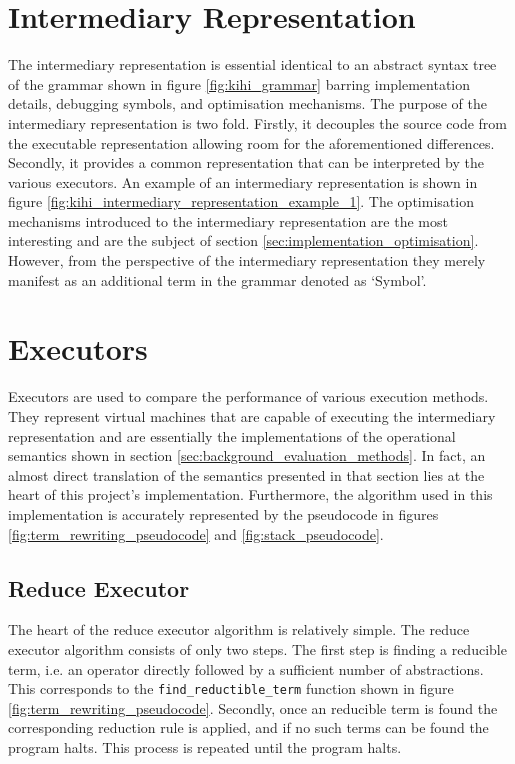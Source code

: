 \section{Intermediary Representation}\label{sec:implementation_intermediary_representation}
The intermediary representation is essential identical to an abstract syntax tree of the grammar shown in figure \ref{fig:kihi_grammar} barring implementation details, debugging symbols, and optimisation mechanisms. The purpose of the intermediary representation is two fold. Firstly, it decouples the source code from the executable representation allowing room for the aforementioned differences. Secondly, it provides a common representation that can be interpreted by the various executors. An example of an intermediary representation is shown in figure \ref{fig:kihi_intermediary_representation_example_1}. The optimisation mechanisms introduced to the intermediary representation are the most interesting and are the subject of section \ref{sec:implementation_optimisation}. However, from the perspective of the intermediary representation they merely manifest as an additional term in the grammar denoted as `Symbol'.




\section{Executors}\label{sec:implementation_executors}
Executors are used to compare the performance of various execution methods. They represent virtual machines that are capable of executing the intermediary representation and are essentially the implementations of the operational semantics shown in section \ref{sec:background_evaluation_methods}. In fact, an almost direct translation of the semantics presented in that section lies at the heart of this project's implementation. Furthermore, the algorithm used in this implementation is accurately represented by the pseudocode in figures \ref{fig:term_rewriting_pseudocode} and \ref{fig:stack_pseudocode}.

\subsection{Reduce Executor}


The heart of the reduce executor algorithm is relatively simple. The reduce executor algorithm consists of only two steps. The first step is finding a reducible term, i.e. an operator directly followed by a sufficient number of abstractions. This corresponds to the \lstinline{find_reductible_term} function shown in figure \ref{fig:term_rewriting_pseudocode}. Secondly, once an reducible term is found the corresponding reduction rule is applied, and if no such terms can be found the program halts. This process is repeated until the program halts.

